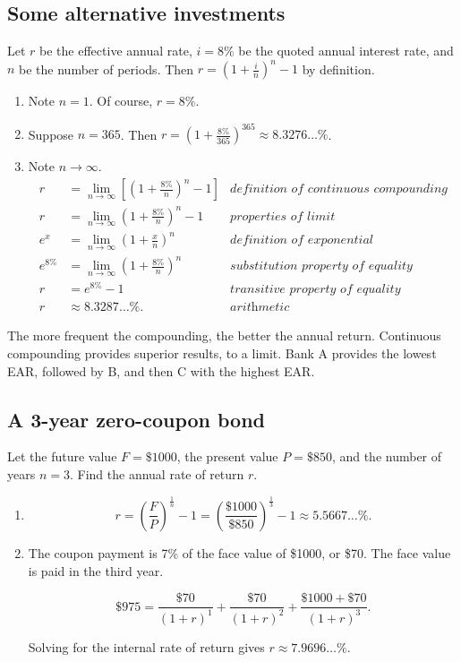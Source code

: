 \documentclass[12pt]{article}
\begin{document}
\subsection{Some alternative investments}
Let $r$ be the effective annual rate, $i=8\%$ be the quoted annual interest rate, and $n$ be the number of periods. Then $r=\left(1+\frac{i}{n}\right)^n-1$ by definition.
\begin{enumerate}
\item Note $n=1$. Of course, $r=8\%$.
\item Suppose $n=365$. Then $r=\left(1+\frac{8\%}{365}\right)^{365}\approx 8.3276\dots\%$.
\item Note $n\to\infty$.
\begin{align*}
r&=\lim_{n\to\infty}{\left[\left(1+\frac{8\%}{n}\right)^n-1\right]}&\textit{definition of continuous compounding}\\
r&=\lim_{n\to\infty}{\left(1+\frac{8\%}{n}\right)^n}-1&\textit{properties of limit}\\
e^x&=\lim_{n\to\infty}{\left(1+\frac{x}{n}\right)^n}&\textit{definition of exponential}\\
e^{8\%}&=\lim_{n\to\infty}{\left(1+\frac{8\%}{n}\right)^n}&\textit{substitution property of equality}\\
r&=e^{8\%}-1&\textit{transitive property of equality}\\
r&\approx 8.3287\dots\%.&\textit{arithmetic}
\end{align*}
\end{enumerate}
The more frequent the compounding, the better the annual return. Continuous compounding provides superior results, to a limit. Bank A provides the lowest EAR, followed by B, and then C with the highest EAR.
\subsection{A 3-year zero-coupon bond}
Let the future value $F=\$1000$, the present value $P=\$850$, and the number of years $n=3$. Find the annual rate of return $r$.
\begin{enumerate}
\item
\[r=\left(\frac{F}{P}\right)^{\frac{1}{n}}-1=\left(\frac{\$1000}{\$850}\right)^{\frac{1}{3}}-1\approx 5.5667\dots\%.\]
\item The coupon payment is 7\% of the face value of \$1000, or \$70. The face value is paid in the third year.

\[\$975=\frac{\$70}{(1+r)^1}+\frac{\$70}{(1+r)^2}+\frac{\$1000+\$70}{(1+r)^3}.\]

Solving for the internal rate of return gives $r\approx 7.9696\dots\%$.
\end{enumerate}
\end{document}

